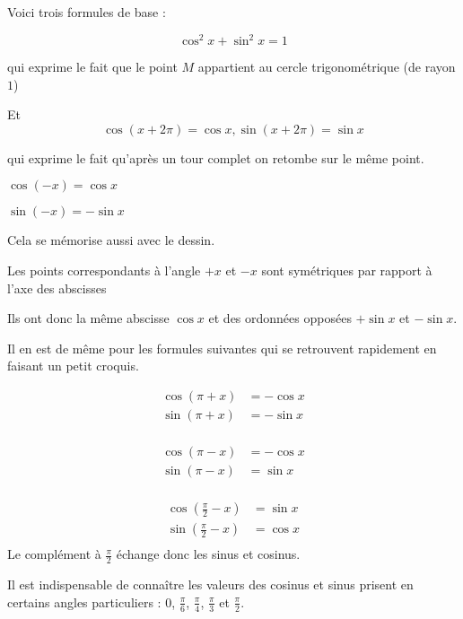 \change

Voici trois formules de base :

$$ \cos^2 x + \sin^2 x = 1$$

qui exprime le fait que le point $M$ appartient au cercle trigonométrique (de rayon $1$)

Et $$\cos(x+2\pi)=\cos x,  \sin(x+2\pi)=\sin x$$

qui exprime le fait qu'après un tour complet on retombe sur le même point.


\diapo

$\cos (-x) = \cos x$

$\sin (-x) = -\sin x$ 

Cela se mémorise aussi avec le dessin.  

Les points correspondants à l'angle
$+x$ et $-x$ sont symétriques par rapport à l'axe des abscisses 

Ils ont donc la même abscisse $\cos x$
et des ordonnées opposées $+\sin x$ et $-\sin x$.


\diapo

Il en est de même pour les formules suivantes 
qui se retrouvent rapidement en faisant un petit croquis.

\begin{align*}
\cos (\pi + x) &= -\cos x \\
\sin (\pi + x) &= -\sin x \\  
\end{align*}  

\begin{align*}
\cos (\pi - x) &= -\cos x \\
\sin (\pi - x) &= \sin x \\  
\end{align*}  

\begin{align*}
\cos (\frac\pi2 - x) &= \sin x \\
\sin (\frac\pi2 - x) &= \cos x \\  
\end{align*}  
Le complément à $\frac\pi2$ échange donc les sinus et cosinus.


\diapo

Il est indispensable de connaître les valeurs des cosinus et sinus
prisent en certains angles particuliers : $0$, $\frac\pi6$,
$\frac\pi4$, $\frac\pi3$ et $\frac\pi2$.

